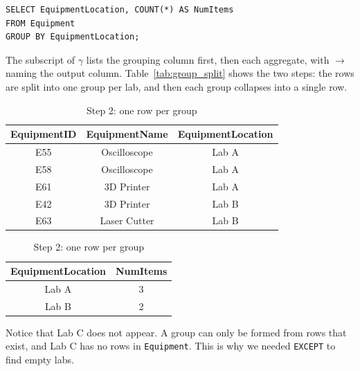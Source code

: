 \begin{translation}
  \sqlrow
\begin{verbatim}
SELECT EquipmentLocation, COUNT(*) AS NumItems
FROM Equipment
GROUP BY EquipmentLocation;
\end{verbatim}
\end{translation}

The subscript of $\gamma$ lists the grouping column first, then each aggregate, with $\to$ naming the output column. Table~\ref{tab:group_split} shows the two steps: the rows are split into one group per lab, and then each group collapses into a single row.

\begin{table}[H]
\centering
\begin{minipage}[t]{0.58\textwidth}
\centering
\small
\setlength{\tabcolsep}{4pt}
\begin{tabular}{|c|c|c|}
\hline
{EquipmentID} & {EquipmentName} & {EquipmentLocation} \\
\hline
E55 & Oscilloscope & Lab A \\
E58 & Oscilloscope & Lab A \\
E61 & 3D Printer & Lab A \\
\hline
E42 & 3D Printer & Lab B \\
E63 & Laser Cutter & Lab B \\
\hline
\end{tabular}
\caption{Step 1: rows split into groups}
\label{tab:group_split}
\end{minipage}
\hfill
\begin{minipage}[t]{0.38\textwidth}
\centering
\small
\setlength{\tabcolsep}{4pt}
\begin{tabular}{|c|c|}
\hline
{EquipmentLocation} & {NumItems} \\
\hline
Lab A & 3 \\
\hline
Lab B & 2 \\
\hline
\end{tabular}
\caption{Step 2: one row per group}
\label{tab:group_count}
\end{minipage}
\end{table}

Notice that Lab C does not appear. A group can only be formed from rows that exist, and Lab C has no rows in \texttt{Equipment}. This is why we needed \texttt{EXCEPT} to find empty labs.


